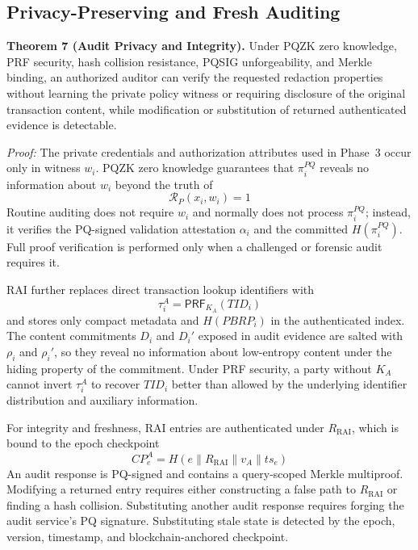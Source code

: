\documentclass[lettersize,journal]{IEEEtran}
\begin{document}
    
    
    \subsection{Privacy-Preserving and Fresh Auditing}
    
    \textbf{Theorem 7 (Audit Privacy and Integrity).}
    Under PQZK zero knowledge, PRF security, hash collision resistance,
    PQSIG unforgeability, and Merkle binding, an authorized auditor can
    verify the requested redaction properties without learning the
    private policy witness or requiring disclosure of the original
    transaction content, while modification or substitution of returned
    authenticated evidence is detectable.
    
    \emph{Proof:}
    The private credentials and authorization attributes used in
    Phase~3 occur only in witness $w_i$. PQZK zero knowledge guarantees
    that $\pi_i^{PQ}$ reveals no information about $w_i$ beyond the truth
    of
    \begin{equation}
    \mathcal{R}_{P}(x_i,w_i)=1
    \label{eq:sec_zk_privacy}
    \end{equation}
    Routine auditing does not require $w_i$ and normally does not process
    $\pi_i^{PQ}$; instead, it verifies the PQ-signed validation
    attestation $\alpha_i$ and the committed $H(\pi_i^{PQ})$. Full proof
    verification is performed only when a challenged or forensic audit
    requires it.
    
    RAI further replaces direct transaction lookup identifiers with
    \begin{equation}
    \tau_i^A=\mathsf{PRF}_{K_A}(TID_i)
    \label{eq:sec_rai_token}
    \end{equation}
    and stores only compact metadata and $H(PBRP_i)$ in the authenticated
    index.  {The content commitments $D_i$ and $D_i'$ exposed
    in audit evidence are salted with $\rho_i$ and $\rho_i'$, so they reveal
    no information about low-entropy content under the hiding property of
    the commitment.} Under PRF security, a party without $K_A$ cannot invert
    $\tau_i^A$ to recover $TID_i$ better than allowed by the underlying
    identifier distribution and auxiliary information.
    
    For integrity and freshness, RAI entries are authenticated under
    $R_{\mathrm{RAI}}$, which is bound to the epoch checkpoint
    \begin{equation}
    CP_e^A=
    H(e\parallel R_{\mathrm{RAI}}\parallel v_A\parallel ts_e)
    \label{eq:sec_audit_cp}
    \end{equation}
    An audit response is PQ-signed and contains a query-scoped Merkle
    multiproof. Modifying a returned entry requires either constructing a
    false path to $R_{\mathrm{RAI}}$ or finding a hash collision.
    Substituting another audit response requires forging the audit
    service's PQ signature. Substituting stale state is detected by the
    epoch, version, timestamp, and blockchain-anchored checkpoint.
    
\end{document}
